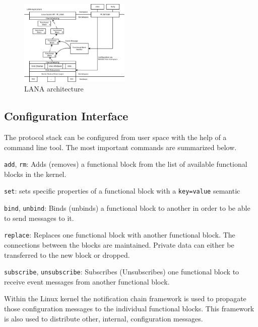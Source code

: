 \documentclass{sig-alternate}
\begin{document}
\begin{figure}
\centering
\includegraphics[width=0.47\textwidth]{figures/architecture.pdf}
\caption{LANA architecture}
\label{fig:architecture}
\end{figure}


\subsection{Configuration Interface}
The protocol stack can be configured from user space with the help of a 
command line tool. The most important commands are summarized below.
\begin{compactitem}
\item \texttt{add}, \texttt{rm}: Adds (removes) a functional block from the 
      list of available functional blocks in the kernel. 
\item \texttt{set}: sets specific properties of a functional block with a 
      \texttt{key=value} semantic
\item \texttt{bind}, \texttt{unbind}: Binds (unbinds) a functional block 
      to another in order to be able to send messages to it. 
\item \texttt{replace}: Replaces one functional block with another 
      functional block. The connections between the blocks are maintained. 
      Private data can either be transferred to the new block or dropped.
\item \texttt{subscribe}, \texttt{unsubscribe}: Subscribes (Unsubscribes) one 
      functional block to receive event messages from another functional block.
\end{compactitem}
Within the Linux kernel the notification chain framework is used to propagate those configuration messages to the individual functional blocks. This framework is also used to distribute other, internal, configuration messages. 
\end{document}

